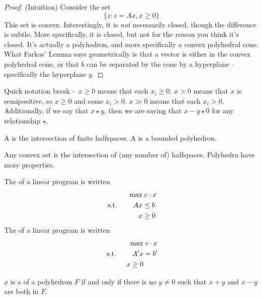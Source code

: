 \documentclass[10pt]{article}
\begin{document}
\begin{proof}
	(Intuition) Consider the set \[\{z : z = Ax,x\ge 0\}\] This set is convex. Interestingly, it is \emph{not} necessarily closed, though the difference is subtle. More specifically, it is closed, but not for the reason you think it's closed. It's actually a polyhedron, and more specifically a convex polyhedral cone. What Farkas' Lemma says geometrically is that a vector is either in the convex polyhedral cone, or that $b$ can be separated by the cone by a hyperplane -- specifically the hyperplane $y$.
\end{proof}

\begin{remark}
	Quick notation break -- $x \ge 0$ means that each $x_i \ge 0$. $x > 0$ means that $x$ is semipositive, so $x \ge 0$ and some $x_i > 0$. $x \gg 0$ means that each $x_i > 0$. Additionally, if we say that $x \star y$, then we are saying that $x - y \star 0$ for any relationship $\star$.
\end{remark}

\begin{definition}
	A  is the intersection of finite halfspaces. A  is a bounded polyhedron.
\end{definition}

\begin{remark}
	Any convex set is the intersection of (any number of) halfspaces. Polyhedra have more properties.
\end{remark}

\begin{definition}
	The  of a linear program is written \begin{align*} \max &\; c \cdot x \\ \;\text{s.t.}\; \qquad Ax &\le b \\ x &\ge 0\end{align*}The  of a linear program is written \begin{align*} \max &\; c \cdot x \\ \;\text{s.t.}\; \qquad A'x &= b' \\ x \ge 0 \end{align*}
\end{definition}

\begin{definition}
	$x$ is a  of a polyhedron $F$ if and only if there is no $y \ne 0$ such that $x+y$ and $x-y$ are both in $F$.
\end{definition}
\end{document}
